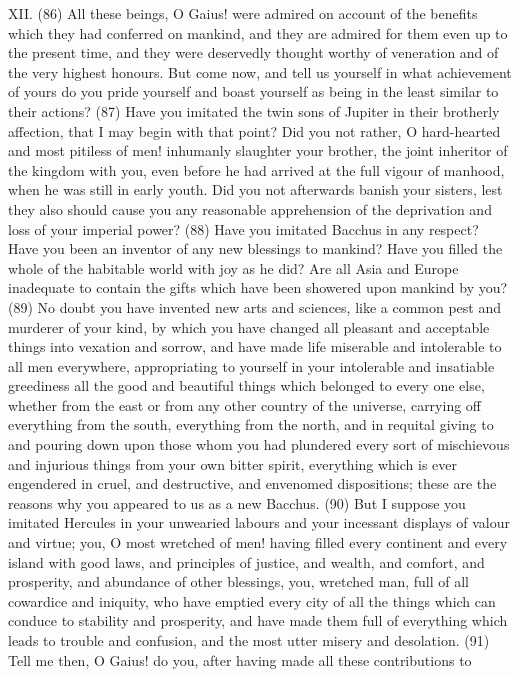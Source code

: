 XII. (86) All these beings, O Gaius! were admired on account of the benefits which they had
conferred on mankind, and they are admired for them even up to the present time, and they were
deservedly thought worthy of veneration and of the very highest honours. But come now, and tell us
yourself in what achievement of yours do you pride yourself and boast yourself as being in the
least similar to their actions? (87) Have you imitated the twin sons of Jupiter in their brotherly
affection, that I may begin with that point? Did you not rather, O hard-hearted and most pitiless of
men! inhumanly slaughter your brother, the joint inheritor of the kingdom with you, even before he
had arrived at the full vigour of manhood, when he was still in early youth. Did you not afterwards
banish your sisters, lest they also should cause you any reasonable apprehension of the
deprivation and loss of your imperial power? (88) Have you imitated Bacchus in any respect?
Have you been an inventor of any new blessings to mankind? Have you filled the whole of the
habitable world with joy as he did? Are all Asia and Europe inadequate to contain the gifts which
have been showered upon mankind by you? (89) No doubt you have invented new arts and
sciences, like a common pest and murderer of your kind, by which you have changed all pleasant
and acceptable things into vexation and sorrow, and have made life miserable and intolerable to all
men everywhere, appropriating to yourself in your intolerable and insatiable greediness all the good
and beautiful things which belonged to every one else, whether from the east or from any other
country of the universe, carrying off everything from the south, everything from the north, and in
requital giving to and pouring down upon those whom you had plundered every sort of mischievous
and injurious things from your own bitter spirit, everything which is ever engendered in cruel, and
destructive, and envenomed dispositions; these are the reasons why you appeared to us as a new
Bacchus. (90) But I suppose you imitated Hercules in your unwearied labours and your incessant
displays of valour and virtue; you, O most wretched of men! having filled every continent and every
island with good laws, and principles of justice, and wealth, and comfort, and prosperity, and
abundance of other blessings, you, wretched man, full of all cowardice and iniquity, who have
emptied every city of all the things which can conduce to stability and prosperity, and have made
them full of everything which leads to trouble and confusion, and the most utter misery and
desolation. (91) Tell me then, O Gaius! do you, after having made all these contributions to
